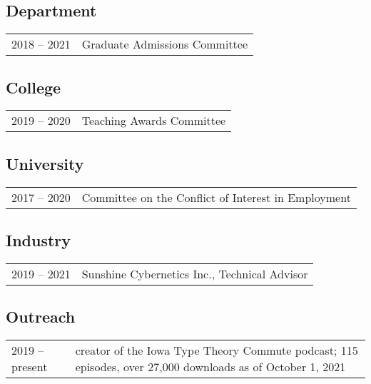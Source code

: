 \documentclass[10pt]{article}
\begin{document}
\begin{IOWA ONLY}
\subsection*{Department}

\begin{tabular}{l@{\quad\ }p{34em}} 
 2018 -- 2021 
 & Graduate Admissions Committee
 \\[.5ex]
\end{tabular}

\subsection*{College}

\begin{tabular}{l@{\quad\ }p{34em}} 
 2019 -- 2020 
 & Teaching Awards Committee
\end{tabular}

\subsection*{University}

\begin{tabular}{l@{\quad\ }p{34em}} 
 2017 -- 2020 
 & Committee on the Conflict of Interest in Employment
 \\[.5ex]
\end{tabular}


\subsection*{Industry}

\begin{tabular}{l@{\quad\ }p{34em}} 
 2019 -- 2021 
 & Sunshine Cybernetics Inc., Technical Advisor
 \\[.5ex]
\end{tabular}

\subsection*{Outreach}

\begin{tabular}{l@{\quad\ }p{34em}} 
 2019 -- present 
 & creator of the Iowa Type Theory Commute podcast; 115 episodes, over 27,000 downloads as of October 1, 2021
 \\[.5ex]
\end{tabular}


\end{IOWA ONLY}
\end{document}
